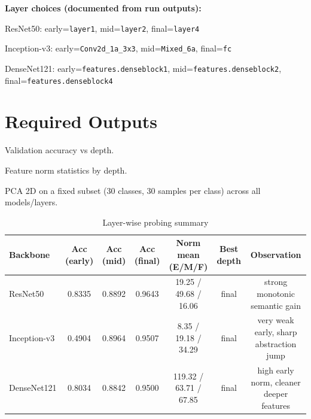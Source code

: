 \documentclass[11pt,a4paper]{report}
\renewenvironment{leftbar}[1][\hsize]
  {\def\FrameCommand{{\color{subsectionblue}\vrule width 3pt}\hspace{0pt}}%
   \MakeFramed{\hsize#1\advance\hsize-\width\FrameRestore}}
  {\endMakeFramed}
\renewenvironment{itemize}{\begin{leftbar}\begin{originalitemize}}{\end{originalitemize}\end{leftbar}}
\begin{document}
\textbf{Layer choices (documented from run outputs):}
\begin{itemize}
  \item ResNet50: early=\texttt{layer1}, mid=\texttt{layer2}, final=\texttt{layer4}
  \item Inception-v3: early=\texttt{Conv2d\_1a\_3x3}, mid=\texttt{Mixed\_6a}, final=\texttt{fc}
  \item DenseNet121: early=\texttt{features.denseblock1}, mid=\texttt{features.denseblock2}, final=\texttt{features.denseblock4}
\end{itemize}

\section{Required Outputs}
\begin{itemize}
  \item Validation accuracy vs depth.
  \item Feature norm statistics by depth.
  \item PCA 2D on a fixed subset (30 classes, 30 samples per class) across all models/layers.
\end{itemize}

\begin{table}[H]
\centering
\caption{Layer-wise probing summary}
\label{tab:s5}
\scriptsize
\begin{tabular}{lcccccc}
\toprule
\rowcolor{tableheader}
\textbf{Backbone} & \textbf{Acc (early)} & \textbf{Acc (mid)} & \textbf{Acc (final)} & \textbf{Norm mean (E/M/F)} & \textbf{Best depth} & \textbf{Observation} \\
\midrule
ResNet50 & 0.8335 & 0.8892 & 0.9643 & 19.25 / 49.68 / 16.06 & final & strong monotonic semantic gain \\
Inception-v3 & 0.4904 & 0.8964 & 0.9507 & 8.35 / 19.18 / 34.29 & final & very weak early, sharp abstraction jump \\
DenseNet121 & 0.8034 & 0.8842 & 0.9500 & 119.32 / 63.71 / 67.85 & final & high early norm, cleaner deeper features \\
\bottomrule
\end{tabular}
\end{table}
\end{document}
